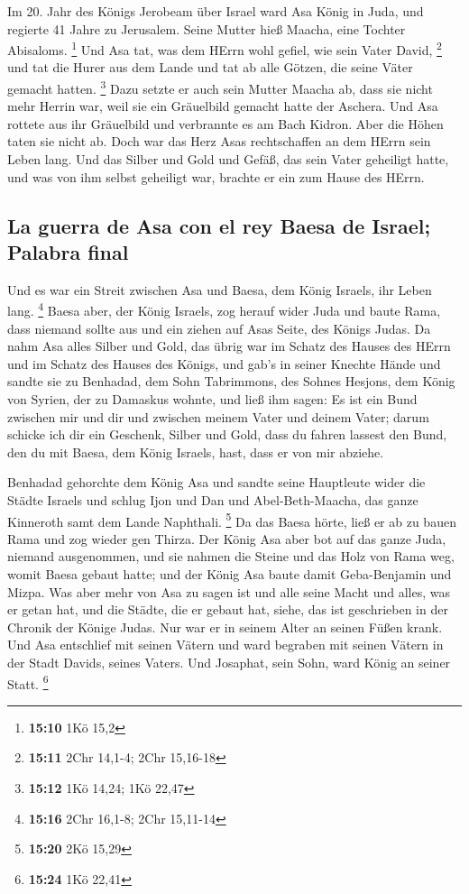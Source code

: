  Im 20. Jahr des Königs Jerobeam über Israel ward Asa
König in Juda,  und regierte 41 Jahre zu Jerusalem. Seine
Mutter hieß Maacha, eine Tochter Abisaloms. \footnote{\textbf{15:10} 1Kö
  15,2}  Und Asa tat, was dem HErrn wohl gefiel, wie sein
Vater David, \footnote{\textbf{15:11} 2Chr 14,1-4; 2Chr 15,16-18}
 und tat die Hurer aus dem Lande und tat ab alle Götzen,
die seine Väter gemacht hatten. \footnote{\textbf{15:12} 1Kö 14,24; 1Kö
  22,47}  Dazu setzte er auch sein Mutter Maacha ab, dass
sie nicht mehr Herrin war, weil sie ein Gräuelbild gemacht hatte der
Aschera. Und Asa rottete aus ihr Gräuelbild und verbrannte es am Bach
Kidron.  Aber die Höhen taten sie nicht ab. Doch war das
Herz Asas rechtschaffen an dem HErrn sein Leben lang. 
Und das Silber und Gold und Gefäß, das sein Vater geheiligt hatte, und
was von ihm selbst geheiligt war, brachte er ein zum Hause des HErrn.

\hypertarget{la-guerra-de-asa-con-el-rey-baesa-de-israel-palabra-final}{%
\subsection{La guerra de Asa con el rey Baesa de Israel; Palabra
final}\label{la-guerra-de-asa-con-el-rey-baesa-de-israel-palabra-final}}

 Und es war ein Streit zwischen Asa und Baesa, dem König
Israels, ihr Leben lang. \footnote{\textbf{15:16} 2Chr 16,1-8; 2Chr
  15,11-14}  Baesa aber, der König Israels, zog herauf
wider Juda und baute Rama, dass niemand sollte aus und ein ziehen auf
Asas Seite, des Königs Judas.  Da nahm Asa alles Silber
und Gold, das übrig war im Schatz des Hauses des HErrn und im Schatz des
Hauses des Königs, und gab's in seiner Knechte Hände und sandte sie zu
Benhadad, dem Sohn Tabrimmons, des Sohnes Hesjons, dem König von Syrien,
der zu Damaskus wohnte, und ließ ihm sagen:  Es ist ein
Bund zwischen mir und dir und zwischen meinem Vater und deinem Vater;
darum schicke ich dir ein Geschenk, Silber und Gold, dass du fahren
lassest den Bund, den du mit Baesa, dem König Israels, hast, dass er von
mir abziehe.

 Benhadad gehorchte dem König Asa und sandte seine
Hauptleute wider die Städte Israels und schlug Ijon und Dan und
Abel-Beth-Maacha, das ganze Kinneroth samt dem Lande Naphthali.
\footnote{\textbf{15:20} 2Kö 15,29}  Da das Baesa hörte,
ließ er ab zu bauen Rama und zog wieder gen Thirza.  Der
König Asa aber bot auf das ganze Juda, niemand ausgenommen, und sie
nahmen die Steine und das Holz von Rama weg, womit Baesa gebaut hatte;
und der König Asa baute damit Geba-Benjamin und Mizpa. 
Was aber mehr von Asa zu sagen ist und alle seine Macht und alles, was
er getan hat, und die Städte, die er gebaut hat, siehe, das ist
geschrieben in der Chronik der Könige Judas. Nur war er in seinem Alter
an seinen Füßen krank.  Und Asa entschlief mit seinen
Vätern und ward begraben mit seinen Vätern in der Stadt Davids, seines
Vaters. Und Josaphat, sein Sohn, ward König an seiner Statt. \footnote{\textbf{15:24}
  1Kö 22,41}

